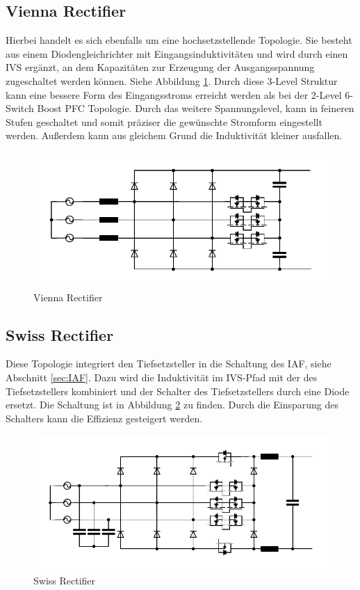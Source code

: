 		\subsection{Vienna Rectifier}
		Hierbei handelt es sich ebenfalls um eine hochsetzstellende Topologie. Sie besteht aus einem Diodengleichrichter mit Eingangsinduktivitäten und wird durch einen \gls{IVS} ergänzt, an dem Kapazitäten zur Erzeugung der Ausgangsspannung zugeschaltet werden können. Siehe Abbildung \ref{fig:vienna}. Durch diese 3-Level Struktur kann eine bessere Form des Eingangsstroms erreicht werden als bei der 2-Level 6-Switch Boost PFC Topologie. Durch das weitere Spannungslevel, kann in feineren Stufen geschaltet und somit präziser die gewünschte Stromform eingestellt werden. Außerdem kann aus gleichem Grund die Induktivität kleiner ausfallen.
		\begin{figure}
			\centering
			\includegraphics[width=1\linewidth]{content/Grafiken/Vienna}
			\caption{Vienna Rectifier}
			\label{fig:vienna}
		\end{figure}
	
	\subsection{Swiss Rectifier}
		Diese Topologie integriert den Tiefsetzsteller in die Schaltung des \gls{IAF}, siehe Abschnitt \ref{sec:IAF}. Dazu wird die Induktivität im IVS-Pfad mit der des Tiefsetzstellers kombiniert und der Schalter des Tiefsetzstellers durch eine Diode ersetzt. Die Schaltung ist in Abbildung \ref{fig:swiss} zu finden. Durch die Einsparung des Schalters kann die Effizienz gesteigert werden.
		\begin{figure}
			\centering
			\includegraphics[width=1\linewidth]{content/Grafiken/Swiss}
			\caption{Swiss Rectifier}
			\label{fig:swiss}
		\end{figure}
		
